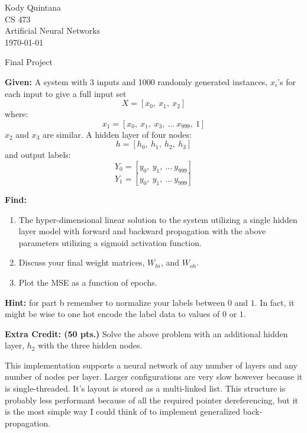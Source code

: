 \documentclass[14pt]{article}
\begin{document}
\begin{flushleft}
 
\large
Kody Quintana\\
CS 473\\
Artificial Neural Networks\\
\today\\
\boldmath

\begin{center}
Final Project
\end{center}

\question
\textbf{Given:}
	A system with 3 inputs and 1000 randomly generated instances, $x_i$'s
	for each input to give a full input set
		\[X = [x_0,\ x_1,\ x_2] \]
	where:
		\[x_1 = [x_0,\ x_1,\ x_3,\ \ldots \ x_{999},\ 1]\]
		$x_2$ and $x_3$ are similar.
	A hidden layer of four nodes:
		\[h = [h_0,\ h_1,\ h_2,\ h_3]\]
	and output labels:
		\[Y_0 = [y_0, \ y_1, \ \ldots \ y_{999}] \]
		\[Y_1 = [y_0, \ y_1, \ \ldots \ y_{999}] \]
	
\textbf{Find:}
	\begin{enumerate}
	\item The hyper-dimensional linear solution to the system utilizing a single hidden layer model
		with forward and backward propagation with the above parameters
		utilizing a sigmoid activation function.
	\item Discuss your final weight matrices, $W_{hi}$, and $W_{oh}$.
	\item Plot the MSE as a function of epochs.
	\end{enumerate}

\textbf{Hint:}
	for part b remember to normalize your labels between $0$ and $1$.
	In fact, it might be wise to one hot encode the label data to values of $0$ or $1$.
\closequestion

\question
\textbf{Extra Credit: (50 pts.)}
	Solve the above problem with an additional hidden layer, $h_2$ with the three hidden nodes.
\closequestion

\newpage


\immediate{}

This implementation supports a neural network of any number of layers and any number of nodes per layer.
Larger configurations are very slow however because it is single-threaded.
It's layout is stored as a multi-linked list.		
This structure is probably less performant because of all the required pointer dereferencing,
but it is the most simple way I could think of to implement generalized back-propagation.


\end{flushleft}
\end{document}
